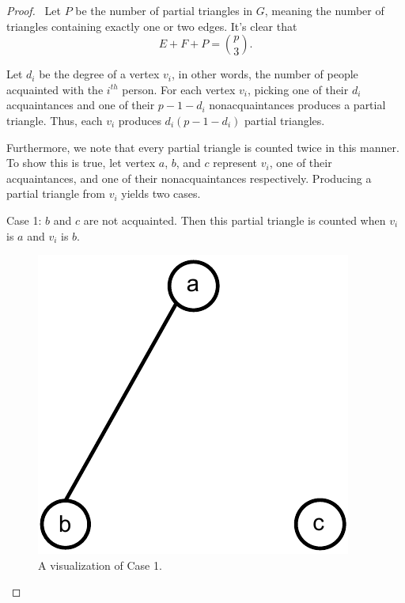 \documentclass[10pt]{amsart}
\begin{document}
\begin{proof} \
    Let $P$ be the number of partial triangles in $G$, meaning the number of triangles containing 
    exactly one or two edges. It's clear that
    \begin{equation}
        E + F + P = \binom{p}{3} \label{eq:total_triangles}.
    \end{equation}

    Let $d_i$ be the degree of a vertex $v_i$, in other words, the number of people acquainted with 
    the $i^{th}$ person. For each vertex $v_i$, picking one of their $d_i$ acquaintances and one of 
    their $p - 1 - d_i$ nonacquaintances produces a partial triangle. Thus, each $v_i$ produces 
    $d_i(p - 1 - d_i)$ partial triangles.

    Furthermore, we note that every partial triangle is counted twice in this manner. To show this
    is true, let vertex $a$, $b$, and $c$ represent $v_i$, one of their acquaintances, and one of 
    their nonacquaintances respectively. Producing a partial triangle from $v_i$ yields two cases.

    \pagebreak

    \noindent Case 1: $b$ and $c$ are not acquainted.
    Then this partial triangle is counted when $v_i$ is $a$ and $v_i$ is $b$. %

    \begin{figure}[h!]
        \centering
        \includegraphics[scale=.6]{../figures/partial_case_1.pdf}
        \caption{A visualization of Case 1.}
    \end{figure}


\end{proof}
\end{document}
